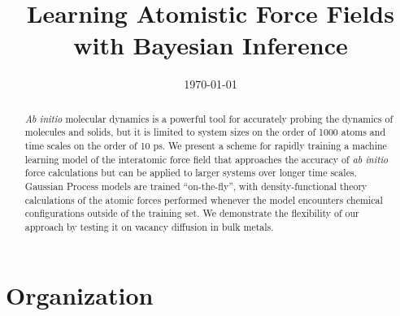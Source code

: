 \documentclass[%
superscriptaddress,
preprint,
amsmath,amssymb,
aps,
prl,
]{revtex4-1}
\begin{document}
\title{Learning Atomistic Force Fields with Bayesian Inference}






\date{\today}

\begin{abstract}
\textit{Ab initio} molecular dynamics is a powerful tool for
accurately probing the dynamics of molecules and solids, but it is limited
to system sizes on the order of 1000 atoms and time scales on the order of
10 ps. We present a scheme for rapidly training a machine learning 
model of the interatomic force field that approaches the accuracy of \textit{ab initio} force calculations but can be applied to larger systems over longer time scales. Gaussian Process models are trained “on-the-fly”, with density-functional theory calculations of the atomic forces performed whenever the model encounters chemical configurations outside of the training set. We demonstrate the flexibility of our approach by testing it on vacancy diffusion in bulk metals.
\end{abstract}

\maketitle

\section{Organization}
\end{document}
